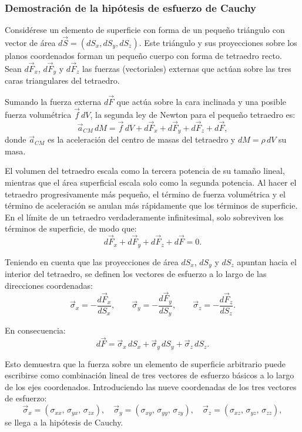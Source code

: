 \subsubsection{Demostración de la hipótesis de esfuerzo de Cauchy}

Considérese un elemento de superficie con forma de un pequeño triángulo con vector de área $d\vec{S} = (dS_x, dS_y, dS_z)$. Este triángulo y sus proyecciones sobre los planos coordenados forman un pequeño cuerpo con forma de tetraedro recto. Sean $d\vec{F}_x$, $d\vec{F}_y$ y $d\vec{F}_z$ las fuerzas (vectoriales) externas que actúan sobre las tres caras triangulares del tetraedro.

Sumando la fuerza externa $d\vec{F}$ que actúa sobre la cara inclinada y una posible fuerza volumétrica $\vec{f}\,dV$, la segunda ley de Newton para el pequeño tetraedro es:
$$ \vec{a}_{CM}\,dM = \vec{f}\,dV + d\vec{F}_x + d\vec{F}_y + d\vec{F}_z + d\vec{F}, $$
donde $\vec{a}_{CM}$ es la aceleración del centro de masas del tetraedro y $dM = \rho\,dV$ su masa.

El volumen del tetraedro escala como la tercera potencia de su tamaño lineal, mientras que el área superficial escala solo como la segunda potencia. Al hacer el tetraedro progresivamente más pequeño, el término de fuerza volumétrica y el término de aceleración se anulan más rápidamente que los términos de superficie. En el límite de un tetraedro verdaderamente infinitesimal, solo sobreviven los términos de superficie, de modo que:
$$ d\vec{F}_x + d\vec{F}_y + d\vec{F}_z + d\vec{F} = 0. $$

Teniendo en cuenta que las proyecciones de área $dS_x$, $dS_y$ y $dS_z$ apuntan hacia el interior del tetraedro, se definen los vectores de esfuerzo a lo largo de las direcciones coordenadas:
$$ \vec{\sigma}_x = -\frac{d\vec{F}_x}{dS_x}, \qquad \vec{\sigma}_y = -\frac{d\vec{F}_y}{dS_y}, \qquad \vec{\sigma}_z = -\frac{d\vec{F}_z}{dS_z}. $$

En consecuencia:
$$ d\vec{F} = \vec{\sigma}_x\,dS_x + \vec{\sigma}_y\,dS_y + \vec{\sigma}_z\,dS_z. $$

Esto demuestra que la fuerza sobre un elemento de superficie arbitrario puede escribirse como combinación lineal de tres vectores de esfuerzo básicos a lo largo de los ejes coordenados. Introduciendo las nueve coordenadas de los tres vectores de esfuerzo:
$$ \vec{\sigma}_x = (\sigma_{xx},\, \sigma_{yx},\, \sigma_{zx}), \quad \vec{\sigma}_y = (\sigma_{xy},\, \sigma_{yy},\, \sigma_{zy}), \quad \vec{\sigma}_z = (\sigma_{xz},\, \sigma_{yz},\, \sigma_{zz}), $$
se llega a la hipótesis de Cauchy.
